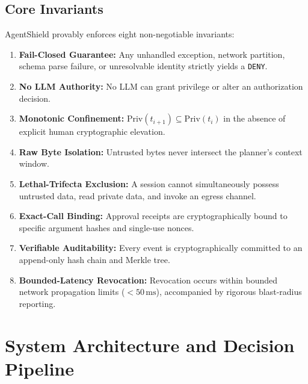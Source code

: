 \documentclass[conference]{IEEEtran}
\begin{document}
\subsection{Core Invariants}
AgentShield provably enforces eight non-negotiable invariants:
\begin{enumerate}
    \item \textbf{Fail-Closed Guarantee:} Any unhandled exception, network partition, schema parse failure, or unresolvable identity strictly yields a \texttt{DENY}.
    \item \textbf{No LLM Authority:} No LLM can grant privilege or alter an authorization decision.
    \item \textbf{Monotonic Confinement:} $\text{Priv}(t_{i+1}) \subseteq \text{Priv}(t_i)$ in the absence of explicit human cryptographic elevation.
    \item \textbf{Raw Byte Isolation:} Untrusted bytes never intersect the planner's context window.
    \item \textbf{Lethal-Trifecta Exclusion:} A session cannot simultaneously possess untrusted data, read private data, and invoke an egress channel.
    \item \textbf{Exact-Call Binding:} Approval receipts are cryptographically bound to specific argument hashes and single-use nonces.
    \item \textbf{Verifiable Auditability:} Every event is cryptographically committed to an append-only hash chain and Merkle tree.
    \item \textbf{Bounded-Latency Revocation:} Revocation occurs within bounded network propagation limits ($<50\,\text{ms}$), accompanied by rigorous blast-radius reporting.
\end{enumerate}

\section{System Architecture and Decision Pipeline}
\label{sec:architecture}
\end{document}
